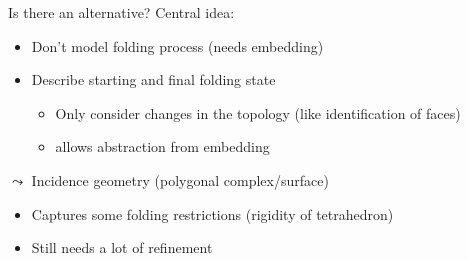 
\begin{frame}{Is there an alternative?}
    \pause
    Central idea:
    \begin{itemize}
        \pause
        \item Don't model folding process (needs embedding)
        \pause
        \item Describe starting and final folding state
            \begin{itemize}
                \pause
                \item Only consider changes in the topology
                    \pause (like identification of faces)
                \pause
                \item allows abstraction from embedding
            \end{itemize}
    \end{itemize}


    \pause
    $\leadsto$ Incidence geometry (polygonal complex/surface)

    \begin{itemize}
        \pause
        \item Captures some folding restrictions \pause (rigidity of tetrahedron)
        \pause
        \item Still needs a lot of refinement
    \end{itemize}
\end{frame}


